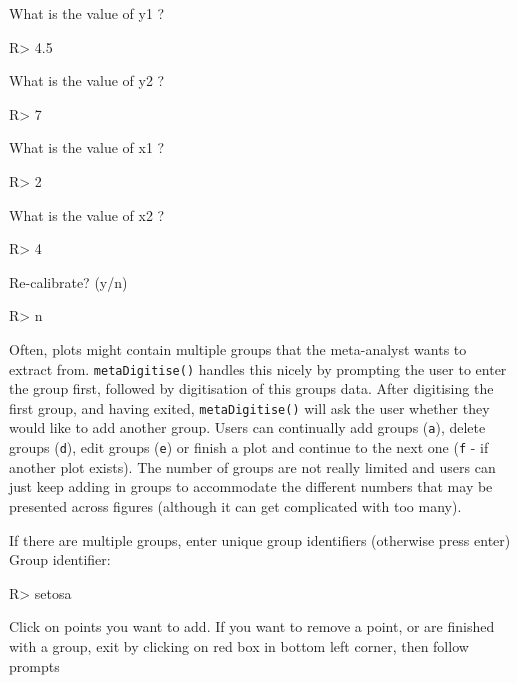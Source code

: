 \documentclass[12pt]{article}
\newcommand{\code}[1]{\texttt{#1}}
\newcommand{\fct}[1]{\texttt{#1()}}
\begin{document}
\begin{CodeChunk}
\begin{CodeOutput}
What is the value of y1 ?
\end{CodeOutput}
\begin{CodeInput}
R> 4.5
\end{CodeInput}
\begin{CodeOutput}
What is the value of y2 ?
\end{CodeOutput}
\begin{CodeInput}
R> 7
\end{CodeInput}
\begin{CodeOutput}
What is the value of x1 ?
\end{CodeOutput}
\begin{CodeInput}
R> 2
\end{CodeInput}
\begin{CodeOutput}
What is the value of x2 ?
\end{CodeOutput}
\begin{CodeInput}
R> 4
\end{CodeInput}
\begin{CodeOutput}
Re-calibrate? (y/n) 
\end{CodeOutput}
\begin{CodeInput}
R> n
\end{CodeInput}
\end{CodeChunk}

Often, plots might contain multiple groups that the meta-analyst wants to extract from. \fct{metaDigitise} handles this nicely by prompting the user to enter the group first, followed by digitisation of this groups data. After digitising the first group, and having exited, \fct{metaDigitise} will ask the user whether they would like to add another group. Users can continually add groups (\code{a}), delete groups (\code{d}), edit groups (\code{e}) or finish a plot and continue to the next one (\code{f} - if another plot exists). 
The number of groups are not really limited and users can just keep adding in groups to accommodate the different numbers that may be presented across figures (although it can get complicated with too many).

\begin{CodeChunk}
\begin{CodeOutput}
If there are multiple groups, enter unique group identifiers (otherwise press enter)
Group identifier: 
\end{CodeOutput}
\begin{CodeInput}
R> setosa
\end{CodeInput}
\begin{CodeOutput}
Click on points you want to add.
If you want to remove a point, or are finished with a group, 
exit by clicking on red box in bottom left corner, then follow prompts
\end{CodeOutput}
\end{CodeChunk}
\end{document}
